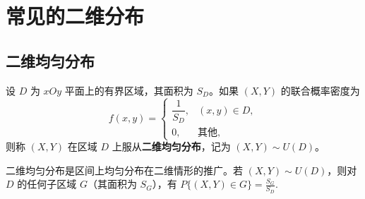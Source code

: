 \documentclass[lang=cn,11pt]{elegantbook}
\begin{document}
\section{常见的二维分布}

\subsection{二维均匀分布}

\begin{definition}[二维均匀分布] \label{def:2d-uniform}
设 $D$ 为 $xOy$ 平面上的有界区域，其面积为 $S_D$。如果 $(X,Y)$ 的联合概率密度为
\[
f(x,y) = \begin{cases} \dfrac{1}{S_D}, & (x,y) \in D, \\ 0, & \text{其他}, \end{cases}
\]
则称 $(X,Y)$ 在区域 $D$ 上服从\textbf{二维均匀分布}，记为 $(X,Y) \sim U(D)$。
\end{definition}

二维均匀分布是区间上均匀分布在二维情形的推广。若 $(X,Y) \sim U(D)$，则对 $D$ 的任何子区域 $G$（其面积为 $S_G$），有
\(
P\{(X,Y) \in G\} = \frac{S_G}{S_D}.
\)
\end{document}
